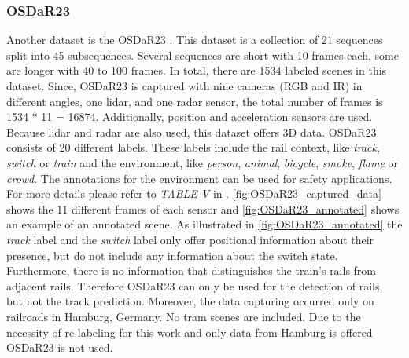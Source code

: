 \subsubsection{OSDaR23}
Another dataset is the OSDaR23 \cite{oSDaR23}.
This dataset is a collection of 21 sequences split into 45 subsequences.
Several sequences are short with 10 frames each, some are longer with 40 to 100 frames.
In total, there are 1534 labeled scenes in this dataset.
Since, OSDaR23 is captured with nine cameras (\ac{RGB} and \ac{IR}) in different angles, one lidar, and one radar sensor, the total number of frames is 1534 * 11 = 16874.
Additionally, position and acceleration sensors are used.
Because lidar and radar are also used, this dataset offers 3D data.
OSDaR23 consists of 20 different labels.
These labels include the rail context, like \textit{track}, \textit{switch} or \textit{train} and the environment, like \textit{person}, \textit{animal}, \textit{bicycle}, \textit{smoke}, \textit{flame} or \textit{crowd}.
The annotations for the environment can be used for safety applications.
For more details please refer to \textit{TABLE V} in \cite{oSDaR23}.
\autoref{fig:OSDaR23_captured_data} shows the 11 different frames of each sensor and \autoref{fig:OSDaR23_annotated} shows an example of an annotated scene.
As illustrated in \autoref{fig:OSDaR23_annotated} the \textit{track} label and the \textit{switch} label only offer positional information about their presence, but do not include any information about the switch state.
Furthermore, there is no information that distinguishes the train's rails from adjacent rails.
Therefore OSDaR23 can only be used for the detection of rails, but not the track prediction.
Moreover, the data capturing occurred only on railroads in Hamburg, Germany.
No tram scenes are included.
Due to the necessity of re-labeling for this work and only data from Hamburg is offered OSDaR23 is not used.


